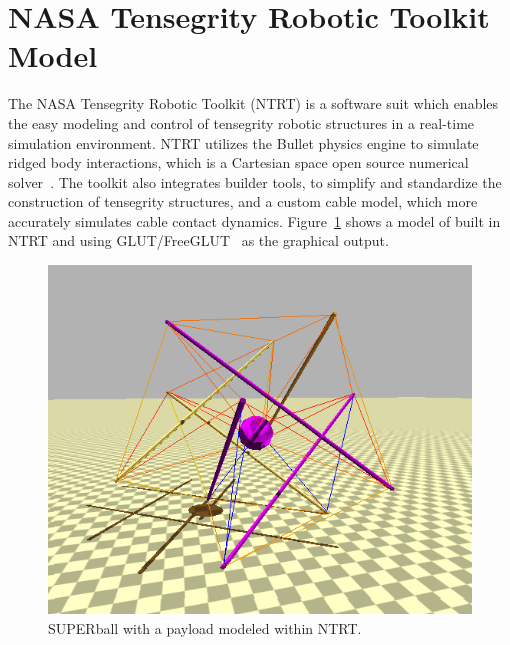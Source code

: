 \section{NASA Tensegrity Robotic Toolkit Model}
The NASA Tensegrity Robotic Toolkit (NTRT) is a software suit which enables the easy modeling and control of tensegrity robotic structures in a real-time simulation environment.
NTRT utilizes the Bullet physics engine to simulate ridged body interactions, which is a Cartesian space open source numerical solver~\cite{coumans2012bullet}.
The toolkit also integrates builder tools, to simplify and standardize the construction of tensegrity structures, and a custom cable model, which more accurately simulates cable contact dynamics.
Figure~\ref{fig:NTRT_SB} shows a model of \SB{} built in NTRT and using GLUT/FreeGLUT~\cite{baker2008freeglut} as the graphical output.

\begin{figure}[th]
      \centering
      \includegraphics[width=0.8\columnwidth]{tex/img/1.png}
      \caption{SUPERball with a payload modeled within NTRT.}
      \label{fig:NTRT_SB}
\end{figure}

